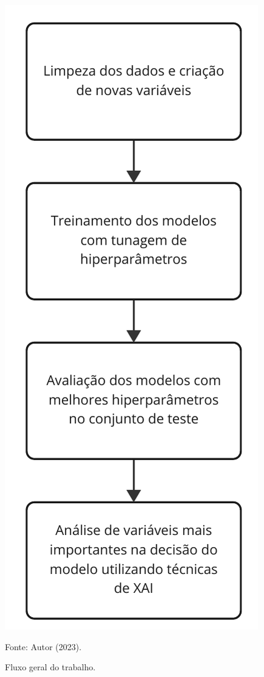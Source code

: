\begin{figure}
	\centering
	\caption{\label{img:fluxogeral}Fluxo geral do trabalho.}
	\includegraphics[scale=0.7]{USPSC-img/fluxo-geral-trabalho.pdf}
	\begin{center}
		Fonte: Autor (2023).
	\end{center}
\end{figure}